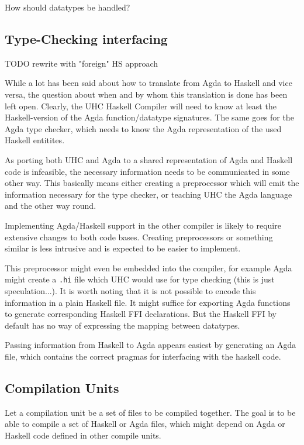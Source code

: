 \documentclass[12pt, a4paper, twoside]{report}
\begin{document}
How should datatypes be handled?

\subsection{Type-Checking interfacing}

TODO rewrite with "foreign" HS approach

While a lot has been said about how to translate from Agda to Haskell and vice versa,
the question about when and by whom this translation is done has been left open. Clearly,
the UHC Haskell Compiler will need to know at least the Haskell-version of the Agda
function/datatype signatures. The same goes for the Agda type checker, which needs to
know the Agda representation of the used Haskell entitites.

As porting both UHC and Agda to a shared representation of Agda and Haskell code
is infeasible, the necessary information needs to be communicated in some other way.
This basically means either creating a preprocessor which will emit the information
necessary for the type checker, or teaching UHC the Agda language and the other way round.

Implementing Agda/Haskell support in the other compiler is likely to require extensive changes
to both code bases. Creating preprocessors or something similar is less intrusive and is expected
to be easier to implement.

This preprocessor might even be embedded into the compiler, for example Agda might create
a \texttt{.hi} file which UHC would use for type checking (this is just speculation...). It is worth noting
that it is not possible to encode this information in a plain Haskell file. It might suffice for
exporting Agda functions to generate corresponding Haskell FFI declarations. But the Haskell FFI
by default has no way of expressing the mapping between datatypes.

Passing information from Haskell to Agda appears easiest by generating an Agda file,
which contains the correct pragmas for interfacing with the haskell code.

\subsection{Compilation Units}
Let a compilation unit be a set of files to be compiled together. The goal is to be able to compile a set of
Haskell or Agda files, which might depend on Agda or Haskell code defined in other compile units.
\end{document}
